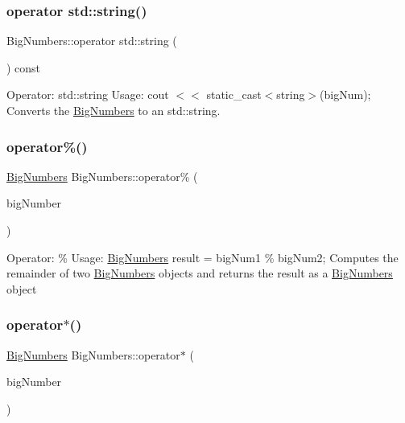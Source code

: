 \subsubsection{\texorpdfstring{operator std\+::string()}{operator std::string()}}
{\footnotesize\ttfamily Big\+Numbers\+::operator std\+::string (\begin{DoxyParamCaption}{ }\end{DoxyParamCaption}) const}

Operator\+: std\+::string Usage\+: cout $<$$<$ static\+\_\+cast$<$string$>$(big\+Num); Converts the \mbox{\hyperlink{class_big_numbers}{Big\+Numbers}} to an std\+::string. \mbox{\label{class_big_numbers_a15bc2fa1946a85e8cd745a26e460d51e}} 
\subsubsection{\texorpdfstring{operator\%()}{operator\%()}}
{\footnotesize\ttfamily \mbox{\hyperlink{class_big_numbers}{Big\+Numbers}} Big\+Numbers\+::operator\% (\begin{DoxyParamCaption}\item[{const \mbox{\hyperlink{class_big_numbers}{Big\+Numbers}} \&}]{big\+Number }\end{DoxyParamCaption})}

Operator\+: \% Usage\+: \mbox{\hyperlink{class_big_numbers}{Big\+Numbers}} result = big\+Num1 \% big\+Num2; Computes the remainder of two \mbox{\hyperlink{class_big_numbers}{Big\+Numbers}} objects and returns the result as a \mbox{\hyperlink{class_big_numbers}{Big\+Numbers}} object \mbox{\label{class_big_numbers_a831e8203da581ad999f9f45940a92776}} 
\subsubsection{\texorpdfstring{operator$\ast$()}{operator*()}}
{\footnotesize\ttfamily \mbox{\hyperlink{class_big_numbers}{Big\+Numbers}} Big\+Numbers\+::operator$\ast$ (\begin{DoxyParamCaption}\item[{const \mbox{\hyperlink{class_big_numbers}{Big\+Numbers}} \&}]{big\+Number }\end{DoxyParamCaption})}

